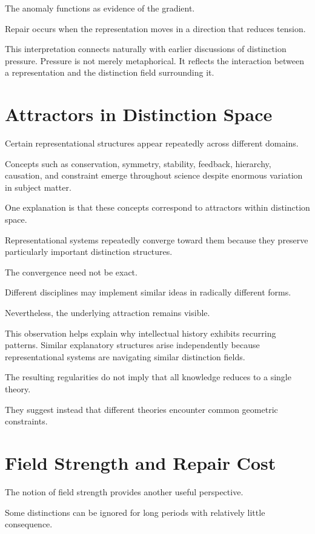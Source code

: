\documentclass[11pt,oneside,openany]{book}
\begin{document}
The anomaly functions as evidence of the gradient.

Repair occurs when the representation moves in a direction that reduces tension.

This interpretation connects naturally with earlier discussions of distinction pressure. Pressure is not merely metaphorical. It reflects the interaction between a representation and the distinction field surrounding it.

\section{Attractors in Distinction Space}

Certain representational structures appear repeatedly across different domains.

Concepts such as conservation, symmetry, stability, feedback, hierarchy, causation, and constraint emerge throughout science despite enormous variation in subject matter.

One explanation is that these concepts correspond to attractors within distinction space.

Representational systems repeatedly converge toward them because they preserve particularly important distinction structures.

The convergence need not be exact.

Different disciplines may implement similar ideas in radically different forms.

Nevertheless, the underlying attraction remains visible.

This observation helps explain why intellectual history exhibits recurring patterns. Similar explanatory structures arise independently because representational systems are navigating similar distinction fields.

The resulting regularities do not imply that all knowledge reduces to a single theory.

They suggest instead that different theories encounter common geometric constraints.

\section{Field Strength and Repair Cost}

The notion of field strength provides another useful perspective.

Some distinctions can be ignored for long periods with relatively little consequence.
\end{document}
